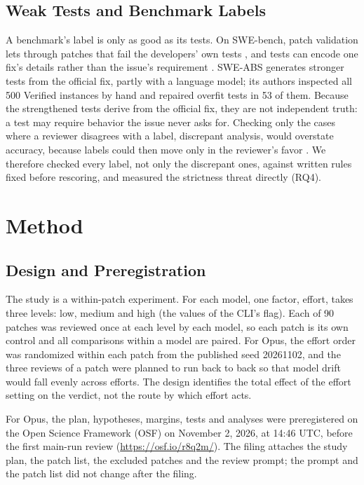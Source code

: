 \documentclass[sigconf,nonacm]{acmart}
\begin{document}
\subsection{Weak Tests and Benchmark Labels}

A benchmark's label is only as good as its tests. On SWE-bench, patch validation lets through patches that fail the developers' own tests \cite{wang2026solved}, and tests can encode one fix's details rather than the issue's requirement \cite{ahmed2026overfitting}. SWE-ABS \cite{yu2026sweabs} generates stronger tests from the official fix, partly with a language model; its authors inspected all 500 Verified instances by hand and repaired overfit tests in 53 of them. Because the strengthened tests derive from the official fix, they are not independent truth: a test may require behavior the issue never asks for. Checking only the cases where a reviewer disagrees with a label, discrepant analysis, would overstate accuracy, because labels could then move only in the reviewer's favor \cite{hadgu1999discrepant}. We therefore checked every label, not only the discrepant ones, against written rules fixed before rescoring, and measured the strictness threat directly (RQ4).

\section{Method}\label{sec:method}

\subsection{Design and Preregistration}\label{sec:design}

The study is a within-patch experiment. For each model, one factor, effort, takes three levels: low, medium and high (the values of the CLI's  flag). Each of 90 patches was reviewed once at each level by each model, so each patch is its own control and all comparisons within a model are paired. For Opus, the effort order was randomized within each patch from the published seed 20261102, and the three reviews of a patch were planned to run back to back so that model drift would fall evenly across efforts. The design identifies the total effect of the effort setting on the verdict, not the route by which effort acts.

For Opus, the plan, hypotheses, margins, tests and analyses were preregistered on the Open Science Framework (OSF) on November 2, 2026, at 14:46 UTC, before the first main-run review (\url{https://osf.io/r8q2m/}). The filing attaches the study plan, the patch list, the excluded patches and the review prompt; the prompt and the patch list did not change after the filing.
\end{document}
